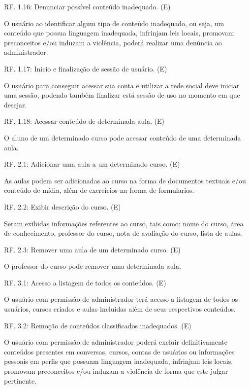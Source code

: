 \documentclass[12pt,a4paper,onecolumn,titlepage]{article}
\begin{document}
\begin{description}
\item RF. 1.16: Denunciar possível conteúdo inadequado. (E)
\item \qquad O usuário ao identificar algum tipo de conteúdo inadequado, ou seja, um conteúdo que possua linguagem inadequada, infrinjam leis locais, promovam preconceitos e/ou induzam a violência, poderá realizar uma denúncia ao administrador.

\item RF. 1.17: Início e finalização de sessão de usuário. (E)
\item \qquad O usuário para conseguir acessar sua conta e utilizar a rede social deve iniciar uma sessão, podendo também finalizar está sessão de uso no momento em que desejar.

\item RF. 1.18: Acessar conteúdo de determinada aula. (E)
\item \qquad O aluno de um determinado curso pode acessar conteúdo de uma determinada aula.

\item RF. 2.1: Adicionar uma aula a um determinado curso. (E)
\item \qquad As aulas podem ser adicionadas ao curso na forma de documentos textuais e/ou conteúdo de mídia, além de exercícios na forma de formularios.

\item RF. 2.2: Exibir descrição do curso. (E)
\item \qquad Seram exibidas informações referentes ao curso, tais como: nome do curso, área de conhecimento, professor do curso, nota de avaliação do curso, lista de aulas.

\item RF. 2.3: Remover uma aula de um determinado curso. (E)
\item \qquad O professor do curso pode remover uma determinada aula.

\item RF. 3.1: Acesso a listagem de todos os conteúdos. (E)
\item \qquad O usuário com permissão de administrador terá acesso a listagem de todos os usuários, cursos criados e aulas incluidas além de seus respectivos conteúdos.

\item RF. 3.2: Remoção de conteúdos classificados inadequados. (E)
\item \qquad O usuário com permissão de administrador poderá excluir definitivamente conteúdos presentes em conversas, cursos, contas de usuários ou informações pessoais em perfis que possuam linguagem inadequada, infrinjam leis locais, promovam preconceitos e/ou induzam a violência de forma que este julgar pertinente.


\end{description}
\end{document}
